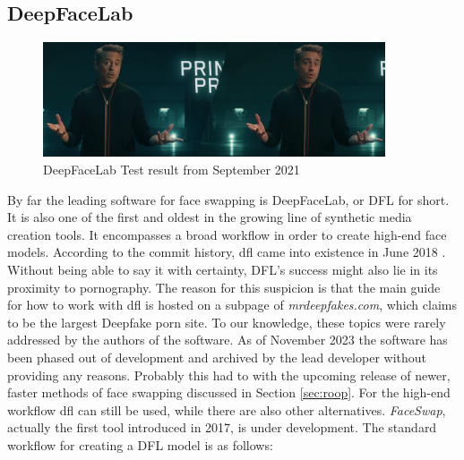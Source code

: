 \documentclass[
  a4paper,  %
  twoside,  %
  bibliography=totoc,
  headsepline,
  cleardoublepage=empty,
  parskip=half,
  draft=false
]{scrbook}
\begin{document}
\subsection{DeepFaceLab}
\begin{figure}[h]
  \centering
  \includegraphics[width=0.9\textwidth]{./graphics/images/dfl-demo.png}
  \caption{DeepFaceLab Test result from September 2021}
  \label{fig:dfl-sample}
\end{figure}
By far the leading software for face swapping is DeepFaceLab, or DFL for short. It is also one of the first and oldest in the growing line of synthetic media creation tools. It encompasses a broad workflow in order to create high-end face models. According to the commit history, \gls{dfl} came into existence in June 2018 \cite{iperovCommitsIperovDeepFaceLab}. Without being able to say it with certainty, DFL's success might also lie in its proximity to pornography. The reason for this suspicion is that the main guide for how to work with \gls{dfl} is hosted on a subpage of \textit{mrdeepfakes.com}, which claims to be the largest Deepfake porn site. To our knowledge, these topics were rarely addressed by the authors of the software. As of November 2023 the software has been phased out of development and archived by the lead developer without providing any reasons. Probably this had to with the upcoming release of newer, faster methods of face swapping discussed in Section \ref{sec:roop}. For the high-end workflow \gls{dfl} can still be used, while there are also other alternatives. \textit{FaceSwap}, actually the first tool introduced in 2017, is under development. The standard workflow for creating a DFL model is as follows:
\end{document}
